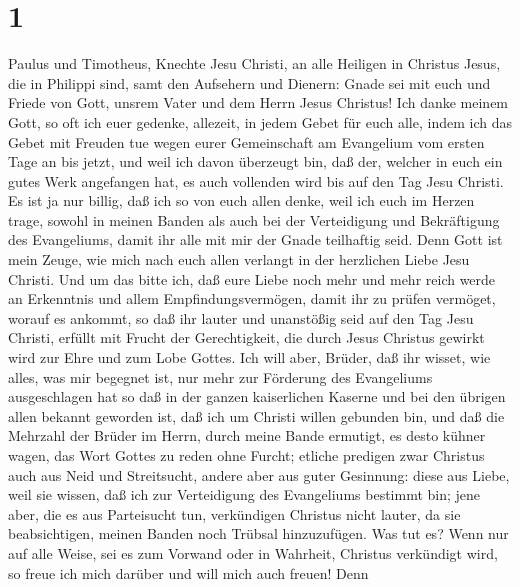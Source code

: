 \hypertarget{section}{%
\section{1}\label{section}}

 Paulus und Timotheus, Knechte Jesu Christi, an alle
Heiligen in Christus Jesus, die in Philippi sind, samt den Aufsehern und
Dienern:  Gnade sei mit euch und Friede von Gott, unsrem
Vater und dem Herrn Jesus Christus!  Ich danke meinem
Gott, so oft ich euer gedenke,  allezeit, in jedem Gebet
für euch alle, indem ich das Gebet mit Freuden tue  wegen
eurer Gemeinschaft am Evangelium vom ersten Tage an bis jetzt,
 und weil ich davon überzeugt bin, daß der, welcher in
euch ein gutes Werk angefangen hat, es auch vollenden wird bis auf den
Tag Jesu Christi.  Es ist ja nur billig, daß ich so von
euch allen denke, weil ich euch im Herzen trage, sowohl in meinen Banden
als auch bei der Verteidigung und Bekräftigung des Evangeliums, damit
ihr alle mit mir der Gnade teilhaftig seid.  Denn Gott ist
mein Zeuge, wie mich nach euch allen verlangt in der herzlichen Liebe
Jesu Christi.  Und um das bitte ich, daß eure Liebe noch
mehr und mehr reich werde an Erkenntnis und allem Empfindungsvermögen,
 damit ihr zu prüfen vermöget, worauf es ankommt, so daß
ihr lauter und unanstößig seid auf den Tag Jesu Christi, 
erfüllt mit Frucht der Gerechtigkeit, die durch Jesus Christus gewirkt
wird zur Ehre und zum Lobe Gottes.  Ich will aber,
Brüder, daß ihr wisset, wie alles, was mir begegnet ist, nur mehr zur
Förderung des Evangeliums ausgeschlagen hat  so daß in
der ganzen kaiserlichen Kaserne und bei den übrigen allen bekannt
geworden ist, daß ich um Christi willen gebunden bin, 
und daß die Mehrzahl der Brüder im Herrn, durch meine Bande ermutigt, es
desto kühner wagen, das Wort Gottes zu reden ohne Furcht;
 etliche predigen zwar Christus auch aus Neid und
Streitsucht, andere aber aus guter Gesinnung:  diese aus
Liebe, weil sie wissen, daß ich zur Verteidigung des Evangeliums
bestimmt bin;  jene aber, die es aus Parteisucht tun,
verkündigen Christus nicht lauter, da sie beabsichtigen, meinen Banden
noch Trübsal hinzuzufügen.  Was tut es? Wenn nur auf alle
Weise, sei es zum Vorwand oder in Wahrheit, Christus verkündigt wird, so
freue ich mich darüber und will mich auch freuen!  Denn
